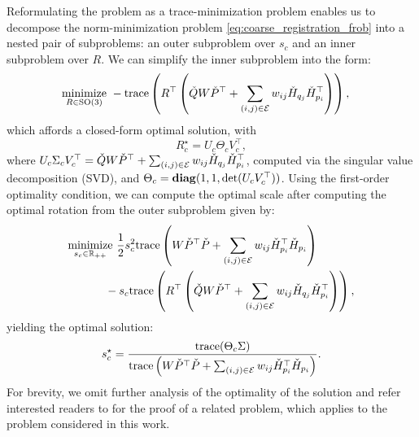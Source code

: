 Reformulating the problem as a trace-minimization problem enables us to decompose the norm-minimization problem \eqref{eq:coarse_registration_frob} into a nested pair of subproblems: an outer subproblem over $s_{c}$ and an inner subproblem over $R$. We can simplify the inner subproblem into the form:
\begin{equation}
    \label{eq:coarse_registration_trace_R}
    \begin{aligned}
        \underset{R \in \mathrm{SO}(3)}{\mathrm{minimize}}\  &-\mathrm{trace}\left(R^{\top} \left(\check{Q}W\check{P}^{\top}
        + \sum_{(i, j) \in \mathcal{E}} w_{ij} \check{H}_{q_{j}}\check{H}_{p_{i}}^{\top}\right)\right),
    \end{aligned}
\end{equation}
which affords a closed-form optimal solution, with 
\begin{equation}
    \label{eq:coarse_registration_opt_R_app}
    R_{c}^{\star} = U_{c} \Theta_{c} V_{c}^{\top},
\end{equation}
where ${U_{c} \Sigma_{c} V_{c}^{\top} = \check{Q}W\check{P}^{\top}
+ \sum_{(i, j) \in \mathcal{E}} w_{ij} \check{H}_{q_{j}}\check{H}_{p_{i}}^{\top}}$, computed via the singular value decomposition (SVD),
and ${\Theta_{c} = \mathrm{\mathbf{diag}}(1, 1, \det(U_{c}V_{c}^{\top}))}$. Using the first-order optimality condition, we can compute the optimal scale after computing the optimal rotation from the outer subproblem given by:
\begin{equation}
    \label{eq:coarse_registration_trace_scale}
    \begin{aligned}
        \underset{s_{c} \in \mathbb{R}_{++}}{\mathrm{minimize}}\  & \frac{1}{2} s_{c}^{2} \mathrm{trace}\left(W\check{P}^{\top}\check{P} + \sum_{(i, j) \in \mathcal{E}} w_{ij} \check{H}_{p_{i}}^{\top}\check{H}_{p_{i}}\right) \\
        & \hspace{-1em} - s_{c}\mathrm{trace}\left(R^{\top} \left(\check{Q} W \check{P}^{\top} + \sum_{(i, j) \in \mathcal{E}} w_{ij} \check{H}_{q_{j}}\check{H}_{p_{i}}^{\top} \right) \right),
    \end{aligned}
\end{equation}
yielding the optimal solution:
\begin{equation}
    \label{eq:coarse_registration_opt_scale_app}
    s_{c}^{\star} = \frac{\mathrm{trace}(\Theta_{c} \Sigma)}{\mathrm{trace}\left(W\check{P}^{\top}\check{P} + \sum_{(i, j) \in \mathcal{E}} w_{ij} \check{H}_{p_{i}}^{\top}\check{H}_{p_{i}}\right)}.
\end{equation}
For brevity, we omit further analysis of the optimality of the solution and refer interested readers to \cite{umeyama1991least} for the proof of a related problem, which applies to the problem considered in this work.

